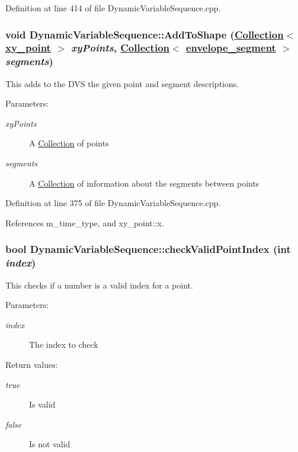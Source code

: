 Definition at line 414 of file Dynamic\-Variable\-Sequence.cpp.\hypertarget{classDynamicVariableSequence_a8}{
\subsubsection[AddToShape]{\setlength{\rightskip}{0pt plus 5cm}void Dynamic\-Variable\-Sequence::Add\-To\-Shape (\hyperlink{classCollection}{Collection}$<$ \hyperlink{structxy__point}{xy\_\-point} $>$ {\em xy\-Points}, \hyperlink{classCollection}{Collection}$<$ \hyperlink{structenvelope__segment}{envelope\_\-segment} $>$ {\em segments})}}
\label{classDynamicVariableSequence_a8}


This adds to the DVS the given point and segment descriptions. \begin{Desc}
\item[Parameters:]
\begin{description}
\item[{\em xy\-Points}]A \hyperlink{classCollection}{Collection} of points \item[{\em segments}]A \hyperlink{classCollection}{Collection} of information about the segments between points \end{description}
\end{Desc}


Definition at line 375 of file Dynamic\-Variable\-Sequence.cpp.

References m\_\-time\_\-type, and xy\_\-point::x.\hypertarget{classDynamicVariableSequence_d3}{
\subsubsection[checkValidPointIndex]{\setlength{\rightskip}{0pt plus 5cm}bool Dynamic\-Variable\-Sequence::check\-Valid\-Point\-Index (int {\em index})}}
\label{classDynamicVariableSequence_d3}


This checks if a number is a valid index for a point. \begin{Desc}
\item[Parameters:]
\begin{description}
\item[{\em index}]The index to check \end{description}
\end{Desc}
\begin{Desc}
\item[Return values:]
\begin{description}
\item[{\em true}]Is valid \item[{\em false}]Is not valid \end{description}
\end{Desc}


